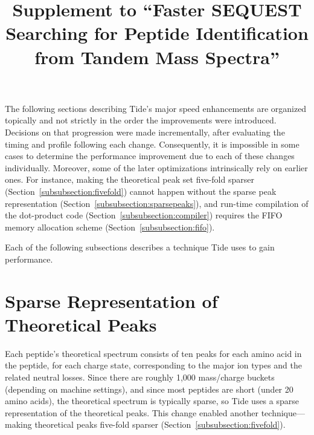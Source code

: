 



\usepackage{float}

\title{Supplement to ``Faster SEQUEST Searching for Peptide
  Identification from Tandem Mass Spectra''}



\maketitle

The following sections describing Tide's major speed enhancements
are organized topically and not strictly in the order the improvements
were introduced. Decisions on that progression were made
incrementally, after evaluating the timing and profile following each
change. Consequently, it is impossible in some cases to determine
the performance improvement due to each of these changes
individually. Moreover, some of the later optimizations intrinsically
rely on earlier ones. For instance, making the theoretical peak set
five-fold sparser (Section~\ref{subsubsection:fivefold}) cannot happen
without the sparse peak representation
(Section~\ref{subsubsection:sparsepeaks}), and run-time compilation of the
dot-product code (Section~\ref{subsubsection:compiler}) requires the FIFO
memory allocation scheme (Section~\ref{subsubsection:fifo}).

Each of the following subsections describes a technique Tide uses to
gain performance.

\section{Sparse Representation of Theoretical Peaks \label{subsubsection:sparsepeaks}}

Each peptide's theoretical spectrum consists of ten peaks for each
amino acid in the peptide, for each charge state, corresponding to the
major ion types and the related neutral losses. Since there are
roughly 1,000 mass/charge buckets (depending on machine settings), and
since most peptides are short (under 20 amino acids), the theoretical
spectrum is typically sparse, so Tide uses a sparse representation of
the theoretical peaks. This change enabled another technique---making
theoretical peaks five-fold sparser (Section~\ref{subsubsection:fivefold}).

